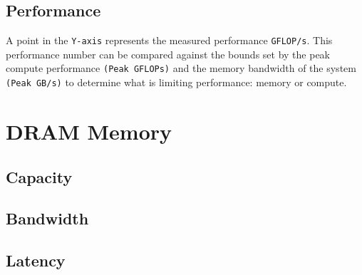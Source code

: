 \documentclass{article}
\begin{document}
\subsection{Performance}
A point in the \verb+Y-axis+ represents the measured performance \verb+GFLOP/s+. This performance number can be compared against the bounds set by the
peak compute performance \verb+(Peak GFLOPs)+ and the memory bandwidth of the system \verb+(Peak GB/s)+ to determine what is limiting performance: memory or compute\cite{Ding_and_Williams}.

% 
% 
\section{DRAM Memory}
\subsection{Capacity}
\subsection{Bandwidth}
\subsection{Latency}
\end{document}
